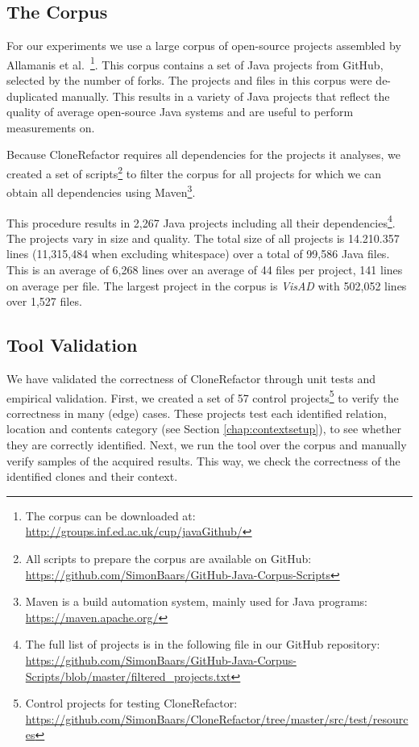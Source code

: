 \documentclass[runningheads]{llncs}
\begin{document}
\subsection{The Corpus}\label{chap:corpus}
For our experiments we use a large corpus of open-source projects assembled by Allamanis et al.~\cite{githubCorpus2013}\footnote{The corpus can be downloaded at: \url{http://groups.inf.ed.ac.uk/cup/javaGithub/}}. This corpus contains a set of Java projects from GitHub, selected by the number of forks. The projects and files in this corpus were de-duplicated manually. This results in a variety of Java projects that reflect the quality of average open-source Java systems and are useful to perform measurements on.

Because CloneRefactor requires all dependencies for the projects it analyses, we created a set of scripts\footnote{All scripts to prepare the corpus are available on GitHub: \url{https://github.com/SimonBaars/GitHub-Java-Corpus-Scripts}} to filter the corpus for all projects for which we can obtain all dependencies using Maven\footnote{Maven is a build automation system, mainly used for Java programs: \url{https://maven.apache.org/}}.

This procedure results in 2,267 Java projects including all their dependencies\footnote{The full list of projects is in the following file in our GitHub repository: \url{https://github.com/SimonBaars/GitHub-Java-Corpus-Scripts/blob/master/filtered_projects.txt}}. The projects vary in size and quality. The total size of all projects is 14.210.357 lines (11,315,484 when excluding whitespace) over a total of 99,586 Java files. This is an average of 6,268 lines over an average of 44 files per project, 141 lines on average per file. The largest project in the corpus is \textit{VisAD} with 502,052 lines over 1,527 files.

\subsection{Tool Validation}
We have validated the correctness of CloneRefactor through unit tests and empirical validation. First, we created a set of 57 control projects\footnote{Control projects for testing CloneRefactor: \url{https://github.com/SimonBaars/CloneRefactor/tree/master/src/test/resources}} to verify the correctness in many (edge) cases. These projects test each identified relation, location and contents category (see Section \ref{chap:contextsetup}), to see whether they are correctly identified. Next, we run the tool over the corpus and manually verify samples of the acquired results. This way, we check the correctness of the identified clones and their context.
\end{document}
